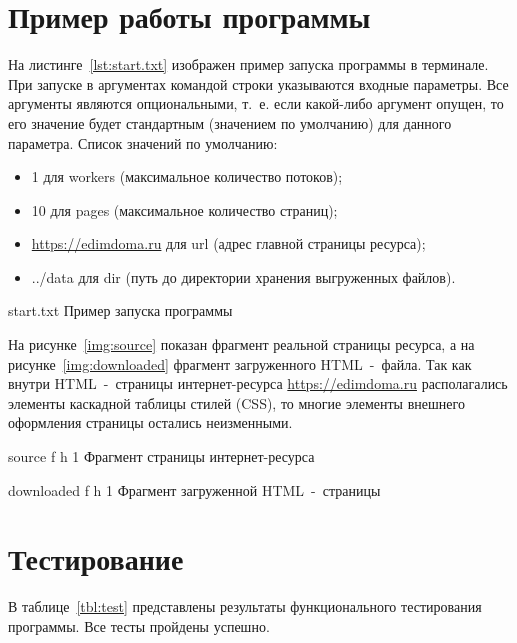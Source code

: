 \chapter{Пример работы программы}

На листинге~\ref{lst:start.txt} изображен пример запуска программы в терминале. При запуске в аргументах командой строки указываются входные параметры. Все аргументы являются опциональными, т.~е. если какой-либо аргумент опущен, то его значение будет стандартным (значением по умолчанию) для данного параметра. Список значений по умолчанию:

\begin{itemize}[label=--]
    \item 1 для workers (максимальное количество потоков);
    \item 10 для pages (максимальное количество страниц);
    \item \url{https://edimdoma.ru} для url (адрес главной страницы ресурса);
    \item ../data для dir (путь до директории хранения выгруженных файлов).
\end{itemize}

{start.txt}
{Пример запуска программы}

На рисунке~\ref{img:source} показан фрагмент реальной страницы ресурса, а на рисунке~\ref{img:downloaded} фрагмент загруженного HTML~-~файла. Так как внутри HTML~-~страницы интернет-ресурса \url{https://edimdoma.ru} располагались элементы каскадной таблицы стилей (CSS), то многие элементы внешнего оформления страницы остались неизменными.

{source}
{f}
{h}
{1 \textwidth}
{Фрагмент страницы интернет-ресурса}

{downloaded}
{f}
{h}
{1 \textwidth}
{Фрагмент загруженной HTML~-~страницы}

\clearpage

\chapter{Тестирование}

В таблице~\ref{tbl:test} представлены результаты функционального тестирования программы. Все тесты пройдены успешно.

